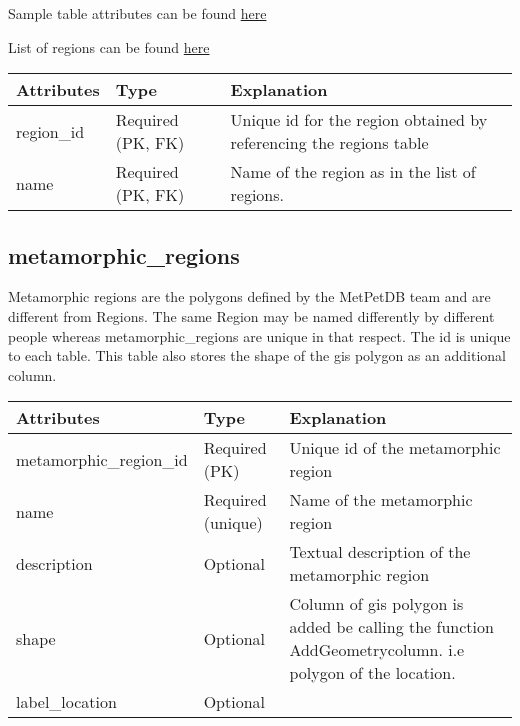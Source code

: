 \documentclass[letterpaper,10pt,english]{sphinxmanual}
\begin{document}
Sample table attributes can be found \href{http://wiki.cs.rpi.edu/trac/metpetdb/wiki/SampleObject}{here}

List of regions can be found \href{http://wiki.cs.rpi.edu/trac/metpetdb/wiki/Region}{here}

\begin{tabulary}{\linewidth}{|L|L|L|}
\hline
\textbf{
Attributes
} & \textbf{
Type
} & \textbf{
Explanation
}\\\hline

region\_id
 & 
Required (PK, FK)
 & 
Unique id for the region obtained by referencing the regions table
\\\hline

name
 & 
Required (PK, FK)
 & 
Name of the region as in the list of regions.
\\\hline
\end{tabulary}



\subsection{metamorphic\_regions}
\label{Table_Description:metamorphic-regions}
Metamorphic regions are the polygons defined by the MetPetDB team and are different from Regions.
The same Region may be named differently by different people whereas metamorphic\_regions are unique in that respect.
The id is unique to each table.
This table also stores the shape of the gis polygon as an additional column.

\begin{tabulary}{\linewidth}{|L|L|L|}
\hline
\textbf{
Attributes
} & \textbf{
Type
} & \textbf{
Explanation
}\\\hline

metamorphic\_region\_id
 & 
Required (PK)
 & 
Unique id of the metamorphic region
\\\hline

name
 & 
Required (unique)
 & 
Name of the metamorphic region
\\\hline

description
 & 
Optional
 & 
Textual description of the metamorphic region
\\\hline

shape
 & 
Optional
 & 
Column of gis polygon is added be calling the function
AddGeometrycolumn. i.e polygon of the location.
\\\hline

label\_location
 & 
Optional
 & \\\hline
\end{tabulary}
\end{document}
